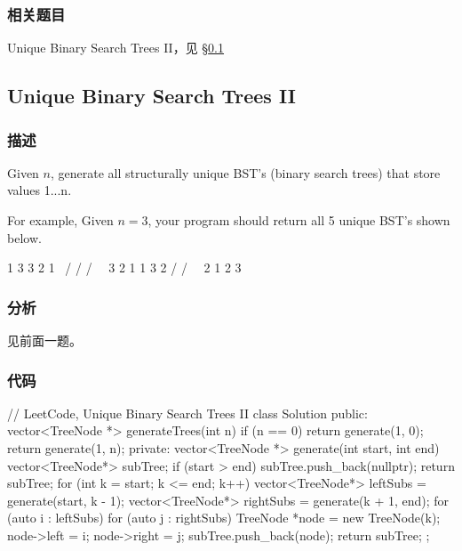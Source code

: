 \subsubsection{相关题目}
\begindot
\item Unique Binary Search Trees II，见 \S \ref{sec:unique-binary-search-trees-ii}
\myenddot


\subsection{Unique Binary Search Trees II}
\label{sec:unique-binary-search-trees-ii}


\subsubsection{描述}
Given $n$, generate all structurally unique BST's (binary search trees) that store values 1...n.

For example,
Given $n = 3$, your program should return all 5 unique BST's shown below.
\begin{Code}
   1         3     3      2      1
    \       /     /      / \      \
     3     2     1      1   3      2
    /     /       \                 \
   2     1         2                 3
\end{Code}


\subsubsection{分析}
见前面一题。


\subsubsection{代码}

\begin{Code}
// LeetCode, Unique Binary Search Trees II
class Solution {
public:
    vector<TreeNode *> generateTrees(int n) {
        if (n == 0) return generate(1, 0);
        return generate(1, n);
    }
private:
    vector<TreeNode *> generate(int start, int end) {
        vector<TreeNode*> subTree;
        if (start > end) {
            subTree.push_back(nullptr);
            return subTree;
        }
        for (int k = start; k <= end; k++) {
            vector<TreeNode*> leftSubs = generate(start, k - 1);
            vector<TreeNode*> rightSubs = generate(k + 1, end);
            for (auto i : leftSubs) {
                for (auto j : rightSubs) {
                    TreeNode *node = new TreeNode(k);
                    node->left = i;
                    node->right = j;
                    subTree.push_back(node);
                }
            }
        }
        return subTree;
    }
};
\end{Code}


